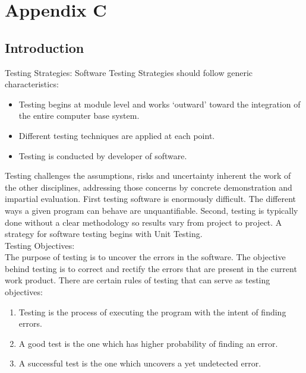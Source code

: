 \documentclass{SureshLimkar}
\begin{document}
\chapter{Appendix C}

\section{Introduction}

Testing Strategies:
Software Testing Strategies should follow generic characteristics:
\begin{itemize}
	\item Testing begins at module level and works ‘outward’ toward the integration of the entire computer base system.
	\item Different testing techniques are applied at each point.
	\item Testing is conducted by developer of software.
\end{itemize}

\hspace{0.5 in}Testing challenges the assumptions, risks and uncertainty inherent the work of the other disciplines, addressing those concerns by concrete demonstration and impartial evaluation. First testing software is enormously difficult. The different ways a given program can behave are unquantifiable. Second, testing is typically done without a clear methodology so results vary from project to project. A strategy for software testing begins with Unit Testing.\\

Testing Objectives:\\

\hspace{0.5 in}The purpose of testing is to uncover the errors in the software. The objective behind testing is to correct and rectify the errors that are present in the current work product. There are certain rules of testing that can serve as testing objectives:
\begin{enumerate}
	\item Testing is the process of executing the program with the intent of finding errors.
	\item A good test is the one which has higher probability of finding an error.
	\item A successful test is the one which uncovers a yet undetected error.
\end{enumerate}
\end{document}
